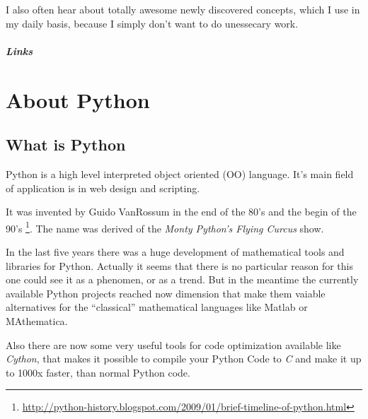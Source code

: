 \documentclass[letterpaper,10pt,english]{manual}
\begin{document}
I also often hear about totally awesome newly discovered concepts, which I use in my daily basis,
because I simply don't want to do unessecary work.
\paragraph{Links}

\resetcurrentobjects
\hypertarget{--doc-Python}{}

\chapter{About Python}


\section{What is Python}

Python is a high level interpreted object oriented (OO) language.
It's main field of application is in web design and scripting.

It was invented by Guido VanRossum in the end of the 80's and the begin of
the 90's \footnote{
\href{http://python-history.blogspot.com/2009/01/brief-timeline-of-python.html}{http://python-history.blogspot.com/2009/01/brief-timeline-of-python.html}
}. The name was derived of the \emph{Monty Python's Flying Curcus}
show.

In the last five years there was a huge development of mathematical tools
and libraries for Python. Actually it seems that there is no particular reason for
this one could see it as a phenomen, or as a trend. But in the meantime the currently
available Python projects reached now dimension that make them vaiable alternatives
for the ``classical'' mathematical languages like Matlab or MAthematica.

Also there are now some very useful tools for code optimization available like \emph{Cython},
that makes it possible to compile your Python Code to \emph{C} and make it up to 1000x faster,
than normal Python code.
\end{document}
